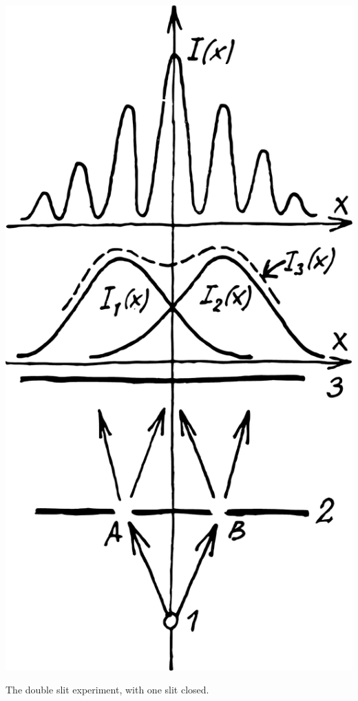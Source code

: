 \documentclass[a4paper,sfsidenotes,colorlinks=true]{tufte-book}
\numberwithin{equation}{section}
\numberwithin{figure}{section}
\begin{document}
\begin{marginfigure}
\centering
\includegraphics[width=\textwidth]{figures/fig-07-02.pdf}
\caption{The double slit experiment, with one slit closed.}
\label{fig-7.2}
\end{marginfigure}
\end{document}
